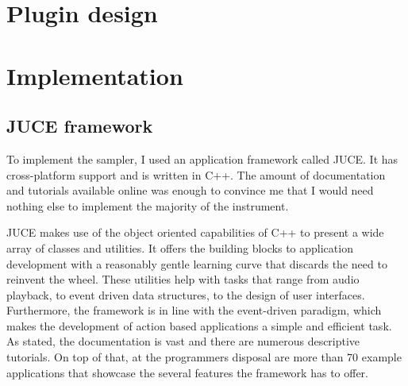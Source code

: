 \documentclass[12pt, a4paper, hidelinks]{article}
\begin{document}
		
	
	\newpage	
	\section{Plugin design}
	
	
	\newpage
	\section{Implementation}
	\subsection{JUCE framework}
	To implement the sampler, I used an application framework called JUCE\cite{juceweb}. It has cross-platform support and is written in C++. The amount of documentation and tutorials available online was enough to convince me that I would need nothing else to implement the majority of the instrument.
	
	JUCE makes use of the object oriented capabilities of C++ to present a wide array of classes and utilities. It offers the building blocks to application development with a reasonably gentle learning curve that discards the need to reinvent the wheel. These utilities help with tasks that range from audio playback, to event driven data structures, to the design of user interfaces. Furthermore, the framework is in line with the event-driven paradigm, which makes the development of action based applications a simple and efficient task. As stated, the documentation is vast and there are numerous descriptive tutorials. On top of that, at the programmers disposal are more than 70 example applications that showcase the several features the framework has to offer. 
	
\end{document}
